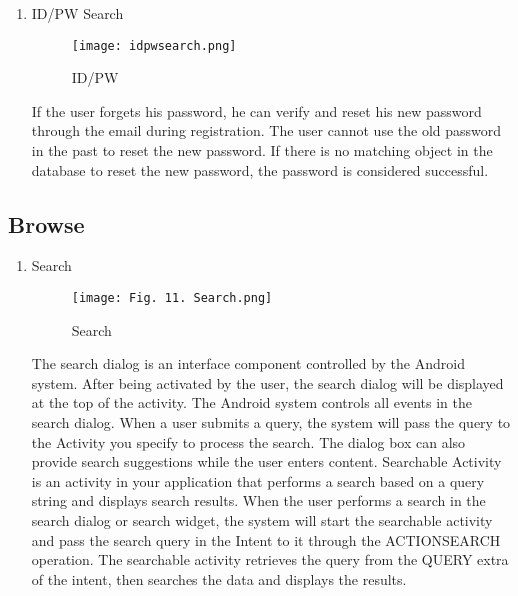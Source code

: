 \documentclass[conference]{IEEEtran}
\begin{document}
\begin{enumerate}
    
    \item ID/PW Search
    \begin{figure}[h]
    \begin{center}
        \centering
        \texttt{[image: idpwsearch.png]}
        \caption{ID/PW}
        \label{fig:my_label}
    \end{center}
    \end{figure}
    
    If the user forgets his password, he can verify and reset his new password through the email during registration. The user cannot use the old password in the past to reset the new password. If there is no matching object in the database to reset the new password, the password is considered successful.
    \vspace{20\baselineskip}
\end{enumerate}


\subsection{Browse}

\begin{enumerate}
    \item Search
    \begin{figure}[h]
    \begin{center}
        \centering
        \texttt{[image: Fig. 11. Search.png]}
        \caption{Search}
        \label{fig:my_label}
    \end{center}
    \end{figure}
    
    The search dialog is an interface component controlled by the Android system. After being activated by the user, the search dialog will be displayed at the top of the activity. The Android system controls all events in the search dialog. When a user submits a query, the system will pass the query to the Activity you specify to process the search. The dialog box can also provide search suggestions while the user enters content. Searchable Activity is an activity in your application that performs a search based on a query string and displays search results. When the user performs a search in the search dialog or search widget, the system will start the searchable activity and pass the search query in the Intent to it through the ACTIONSEARCH operation. The searchable activity retrieves the query from the QUERY extra of the intent, then searches the data and displays the results.\vspace{1\baselineskip}
    


\end{enumerate}
\end{document}
